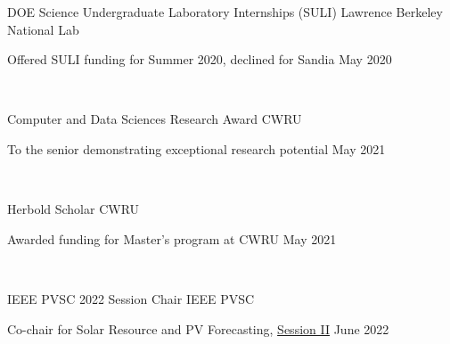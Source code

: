 \documentclass[10pt]{article}
\begin{document}
 {
	
{ 
	DOE Science Undergraduate Laboratory Internships (SULI)} 
\hspace*{0pt}\hfill Lawrence Berkeley National Lab

Offered SULI funding for Summer 2020, declined for Sandia \hspace*{0pt}\hfill May 2020

\

%
%
{ 
Computer and Data Sciences Research Award} 
\hspace*{0pt}\hfill CWRU 

To the senior demonstrating exceptional research potential \hspace*{0pt}\hfill May 2021

\

{ 
Herbold Scholar} 
\hspace*{0pt}\hfill CWRU 

Awarded funding for Master's program at CWRU \hspace*{0pt}\hfill May 2021

\

{ 
IEEE PVSC 2022 Session Chair} 
\hspace*{0pt}\hfill IEEE PVSC 

Co-chair for Solar Resource and PV Forecasting,  \href{https://ieee-pvsc.org/PVSC49/program-full.php?page=program&displayday=6&pads=&start_range=&start_interval=&changing_days=yes&hide_details=}{Session II} \hspace*{0pt}\hfill June 2022

\
%
%



			
			
			
	}
\end{document}
